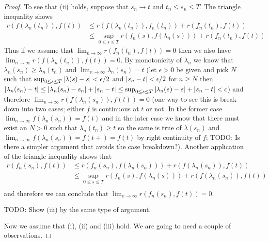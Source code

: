\begin{proof}
To see that (ii) holds, suppose that $s_n \to t$ and $t_n \leq s_n \leq T$.  The triangle inequality shows
\begin{align*}
r(f(\lambda_n(t_n)), f(t)) &\leq r(f(\lambda_n(t_n)), f_n(t_n)) + r(f_n(t_n), f(t))\\
&\leq \sup_{0 \leq s \leq T} r(f_n(s), f(\lambda_n(s))) + r(f_n(t_n), f(t))
\end{align*}
Thus if we assume that $\lim_{n \to \infty} r(f_n(t_n), f(t)) = 0$ then we also have $\lim_{n \to \infty} r(f(\lambda_n(t_n)), f(t)) = 0$.  By monotonicity of $\lambda_n$ we know that
$\lambda_n(s_n) \geq \lambda_n(t_n)$ and $\lim_{n \to \infty} \lambda_n(s_n) = t$ (let $\epsilon > 0$ be given and pick $N$ such that $\sup_{0 \leq s \leq T} \left \vert \lambda(s) - s \right \vert < \epsilon/2$ and $\left \vert s_n - t \right \vert < \epsilon/2$ for $n \geq N$ then $\left \vert \lambda_n(s_n) -t \right \vert \leq \left \vert \lambda_n(s_n) - s_n \right \vert + \left \vert s_n -t \right \vert \leq \sup_{0 \leq s \leq T} \left \vert \lambda_n(s) - s \right \vert + \left \vert s_n -t \right \vert < \epsilon$) and therefore $\lim_{n \to \infty} r(f(\lambda_n(s_n)), f(t)) = 0$ (one way to see this is break down into two cases; either $f$ is continuous at $t$ or not.  In the former case $\lim_{n \to \infty} f(\lambda_n(s_n)) = f(t)$ and in the later case we know that there must exist an $N > 0$ such that $\lambda_n(t_n) \geq t$ so the same is true of $\lambda(s_n)$ and $\lim_{n \to \infty} f(\lambda_n(s_n)) = f(t+) = f(t)$ by right continuity of $f$; TODO: Is there a simpler argument that avoids the case breakdown?).   Another application of the triangle inequality shows that
\begin{align*}
r(f_n(s_n), f(t)) &\leq r(f_n(s_n), f(\lambda_n(s_n))) + r(f(\lambda_n(s_n)), f(t)) \\
&\leq \sup_{0 \leq s \leq T} r(f_n(s), f(\lambda_n(s))) + r(f(\lambda_n(s_n)), f(t)) \\
\end{align*}
and therefore we can conclude that $\lim_{n \to \infty} r(f_n(s_n), f(t)) = 0$.

TODO: Show (iii) by the same type of argument.

Now we assume that (i), (ii) and (iii) hold.  We are going to need a couple of observations.


\end{proof}
